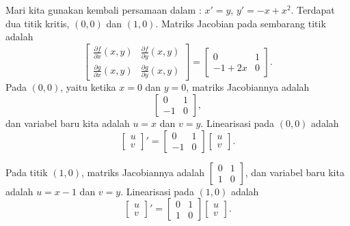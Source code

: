 \begin{example} \label{example:nlin-1b-examplelin}
Mari kita gunakan kembali persamaan dalam
:
$x' = y$, $y' = -x+x^2$. Terdapat dua titik kritis, $(0,0)$
dan $(1,0)$. Matriks Jacobian pada sembarang titik adalah
\begin{equation*}
\begin{bmatrix}
\frac{\partial f}{\partial x}(x,y) &
\frac{\partial f}{\partial y}(x,y) \\
\frac{\partial g}{\partial x}(x,y) &
\frac{\partial g}{\partial y}(x,y)
\end{bmatrix} =
\begin{bmatrix}
0 & 1 \\
-1+2x & 0
\end{bmatrix}.
\end{equation*}
Pada $(0,0)$, yaitu ketika $x=0$ dan $y=0$, matriks Jacobiannya adalah
\begin{equation*}
\begin{bmatrix}
0 & 1 \\
-1 & 0
\end{bmatrix} ,
\end{equation*}
dan variabel baru kita adalah
$u=x$ dan $v=y$. Linearisasi pada $(0,0)$ adalah
\begin{equation*}
\begin{bmatrix} u \\ v \end{bmatrix} ' =
\begin{bmatrix}
0 & 1 \\
-1 & 0
\end{bmatrix}
\begin{bmatrix} u \\ v \end{bmatrix} .
\end{equation*}

Pada titik $(1,0)$, matriks Jacobiannya
adalah
$\left[ \begin{smallmatrix}
0 & 1 \\
1 & 0
\end{smallmatrix} \right]$,
dan variabel baru kita adalah
$u=x-1$ dan $v=y$.
Linearisasi pada $(1,0)$ adalah
\begin{equation*}
\begin{bmatrix} u \\ v \end{bmatrix} ' =
\begin{bmatrix}
0 & 1 \\
1 & 0
\end{bmatrix}
\begin{bmatrix} u \\ v \end{bmatrix} .
\end{equation*}


\end{example}
